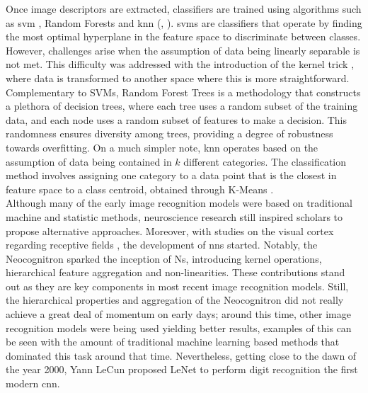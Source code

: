\noindent Once image descriptors are extracted, classifiers are trained using algorithms such as 
\gls{svm} \autocite{cortes1995support}, Random Forests \autocite{ho1995random} and \gls{knn}
(\cite{cover1967nearest}, \cite{fix1989discriminatory}). \glspl{svm} are classifiers that operate 
by finding the most optimal hyperplane in the feature space to discriminate between classes. 
However, challenges arise when the assumption of data being linearly separable is not met. This 
difficulty was addressed with the introduction of the kernel trick \autocite{hofmann2008kernel}, 
where data is transformed to another space where this is more straightforward.\\
Complementary to SVMs, Random Forest Trees is a methodology that constructs a plethora of decision 
trees, where each tree uses a random subset of the training data, and each node uses a random 
subset of features to make a decision. This randomness ensures diversity among trees, providing a 
degree of robustness towards overfitting. On a much simpler note, \gls{knn} operates based on the 
assumption of data being contained in $k$ different categories. The classification method involves 
assigning one category to a data point that is the closest in feature space to a class centroid, 
obtained through K-Means \autocite{macqueen1967some}.\\

\noindent Although many of the early image recognition models were based on traditional machine 
and statistic methods, neuroscience research still inspired scholars to propose alternative 
approaches. Moreover, with studies on the visual cortex regarding receptive fields 
\autocite{hubel1959receptive}, the development of \glspl{nn} started. Notably, the 
Neocognitron \autocite{fukushima1975cognitron} sparked the inception of  Ns, introducing 
kernel operations, hierarchical feature aggregation and non-linearities. These contributions stand 
out as they are key components in most recent image recognition models.
Still, the hierarchical properties and aggregation of the Neocognitron did not really achieve 
a great deal of momentum on early days; around this time, other image recognition models were being 
used yielding better results, examples of this can be seen with the amount of traditional machine 
learning based methods that dominated this task around that time. Nevertheless, getting close to the 
dawn of the year 2000, Yann LeCun proposed LeNet to perform digit recognition 
\autocite{lecun1998gradient} the first modern \gls{cnn}.\\

